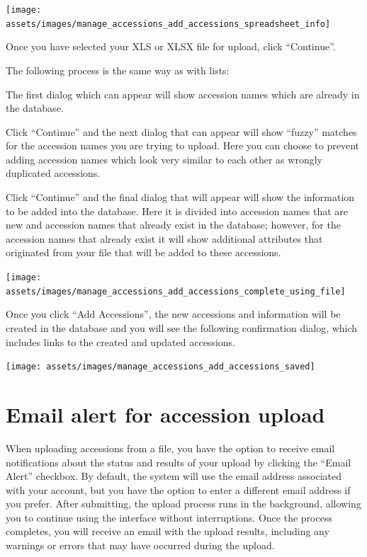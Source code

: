\documentclass[
  12pt,
]{book}
\begin{document}
\begin{center}\texttt{[image: assets/images/manage\_accessions\_add\_accessions\_spreadsheet\_info]} \end{center}

Once you have selected your XLS or XLSX file for upload, click ``Continue''.

The following process is the same way as with lists:

The first dialog which can appear will show accession names which are already in the database.

Click ``Continue'' and the next dialog that can appear will show ``fuzzy'' matches for the accession names you are trying to upload. Here you can choose to prevent adding accession names which look very similar to each other as wrongly duplicated accessions.

Click ``Continue'' and the final dialog that will appear will show the information to be added into the database. Here it is divided into accession names that are new and accession names that already exist in the database; however, for the accession names that already exist it will show additional attributes that originated from your file that will be added to these accessions.

\begin{center}\texttt{[image: assets/images/manage\_accessions\_add\_accessions\_complete\_using\_file]} \end{center}

Once you click ``Add Accessions'', the new accessions and information will be created in the database and you will see the following confirmation dialog, which includes links to the created and updated accessions.

\begin{center}\texttt{[image: assets/images/manage\_accessions\_add\_accessions\_saved]} \end{center}

\hypertarget{email-alert-for-accession-upload}{%
\section{Email alert for accession upload}\label{email-alert-for-accession-upload}}

When uploading accessions from a file, you have the option to receive email notifications about the status and results of your upload by clicking the ``Email Alert'' checkbox. By default, the system will use the email address associated with your account, but you have the option to enter a different email address if you prefer. After submitting, the upload process runs in the background, allowing you to continue using the interface without interruptions. Once the process completes, you will receive an email with the upload results, including any warnings or errors that may have occurred during the upload.
\end{document}
